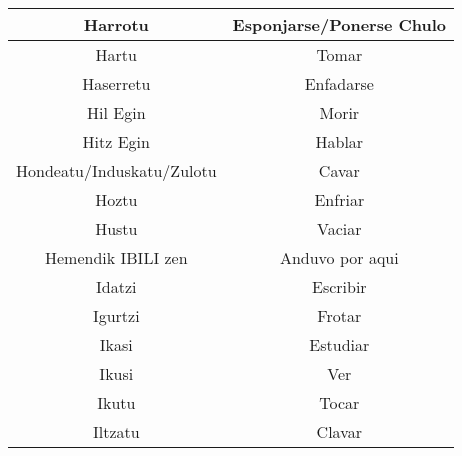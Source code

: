 \documentclass[11pt, a4paper]{article}
\begin{document}
\begin{table}[h]
\begin{tabular}{cc}
		                        Harrotu                          &                    Esponjarse/Ponerse Chulo                    \\ \hline
		                         Hartu                           &                             Tomar                              \\ \hline
		                       Haserretu                         &                           Enfadarse                            \\ \hline
		                        Hil Egin                         &                             Morir                              \\ \hline
		                       Hitz Egin                         &                             Hablar                             \\ \hline
		               Hondeatu/Induskatu/Zulotu                 &                             Cavar                              \\ \hline
		                         Hoztu                           &                            Enfriar                             \\ \hline
		                         Hustu                           &                             Vaciar                             \\ \hline
		                   Hemendik IBILI zen                    &                        Anduvo por aqui                         \\ \hline
		                         Idatzi                          &                            Escribir                            \\ \hline
		                        Igurtzi                          &                             Frotar                             \\ \hline
		                         Ikasi                           &                            Estudiar                            \\ \hline
		                         Ikusi                           &                              Ver                               \\ \hline
		                         Ikutu                           &                             Tocar                              \\ \hline
		                        Iltzatu                          &                             Clavar                             \\ \hline

\end{tabular}
\end{table}
\end{document}
